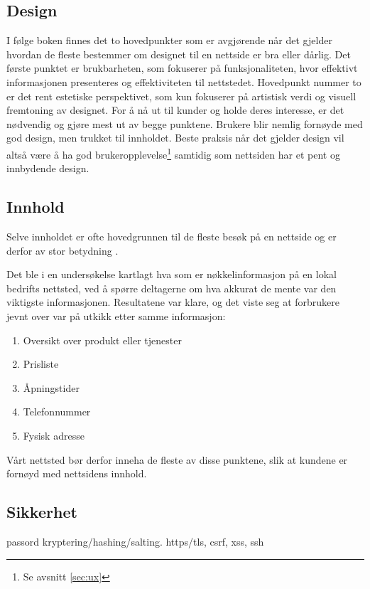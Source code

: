 \subsection{Design}
\label{sec:design}
I følge boken  \cite[s.~5]{beaird2014tpo} finnes det to hovedpunkter som er avgjørende når det gjelder hvordan de fleste bestemmer om designet til en nettside er bra eller dårlig. Det første punktet er brukbarheten, som fokuserer på funksjonaliteten, hvor effektivt informasjonen presenteres og effektiviteten til nettstedet. Hovedpunkt nummer to er det rent estetiske perspektivet, som kun fokuserer på artistisk verdi og visuell fremtoning av designet. For å nå ut til kunder og holde deres interesse, er det nødvendig og gjøre mest ut av begge punktene. Brukere blir nemlig fornøyde med god design, men trukket til innholdet.  Beste praksis når det gjelder design vil altså være å ha god brukeropplevelse\footnote{Se avsnitt \ref{sec:ux}} samtidig som nettsiden har et pent og innbydende design.

\subsection{Innhold}
Selve innholdet er ofte hovedgrunnen til de fleste besøk på en nettside og er derfor av stor betydning \cite{thielsch2014ueo}.

Det ble i en undersøkelse \cite{marchant18wdc} kartlagt hva som er nøkkelinformasjon på en lokal bedrifts nettsted, ved å spørre deltagerne om hva akkurat de mente var den viktigste informasjonen. Resultatene var klare, og det viste seg at forbrukere jevnt over var på utkikk etter samme informasjon:
\begin{enumerate}
\item Oversikt over produkt eller tjenester
\item Prisliste
\item Åpningstider
\item Telefonnummer
\item Fysisk adresse
\end{enumerate}

Vårt nettsted bør derfor inneha de fleste av disse punktene, slik at kundene er fornøyd med nettsidens innhold.

\subsection{Sikkerhet}
\label{sec:analysis-security}
 passord kryptering/hashing/salting. https/tls, csrf, xss, ssh
 \cite{NattTomHeine2015Datasikkerhet}
 
